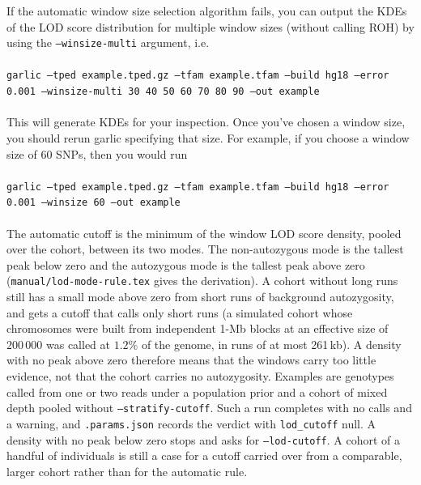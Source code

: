 \documentclass[12pt]{article}%
\begin{document}
\noindent If the automatic window size selection algorithm fails, you can
output the KDEs of the LOD score distribution for multiple window sizes
(without calling ROH) by using the {\tt --winsize-multi} argument, i.e.
~\\\\
{\tt garlic --tped example.tped.gz --tfam example.tfam --build hg18 --error 0.001 --winsize-multi 30 40 50 60 70 80 90 --out example}
~\\\\
\noindent This will generate KDEs for your inspection.  Once you've chosen a
window size, you should rerun garlic specifying that size.  For example, if you
choose a window size of 60 SNPs, then you would run
~\\\\
{\tt garlic --tped example.tped.gz --tfam example.tfam --build hg18 --error 0.001 --winsize 60 --out example}
~\\\\
\noindent The automatic cutoff is the minimum of the window LOD score density, pooled over the cohort, between its two modes.  The non-autozygous mode is the tallest peak below zero and the autozygous mode is the tallest peak above zero ({\tt manual/lod-mode-rule.tex} gives the derivation).  A cohort without long runs still has a small mode above zero from short runs of background autozygosity, and gets a cutoff that calls only short runs (a simulated cohort whose chromosomes were built from independent 1-Mb blocks at an effective size of $200\,000$ was called at $1.2\%$ of the genome, in runs of at most 261\,kb).  A density with no peak above zero therefore means that the windows carry too little evidence, not that the cohort carries no autozygosity.  Examples are genotypes called from one or two reads under a population prior and a cohort of mixed depth pooled without {\tt --stratify-cutoff}.  Such a run completes with no calls and a warning, and {\tt .params.json} records the verdict with {\tt lod\_cutoff} null.  A density with no peak below zero stops and asks for {\tt --lod-cutoff}.  A cohort of a handful of individuals is still a case for a cutoff carried over from a comparable, larger cohort rather than for the automatic rule.
\end{document}
